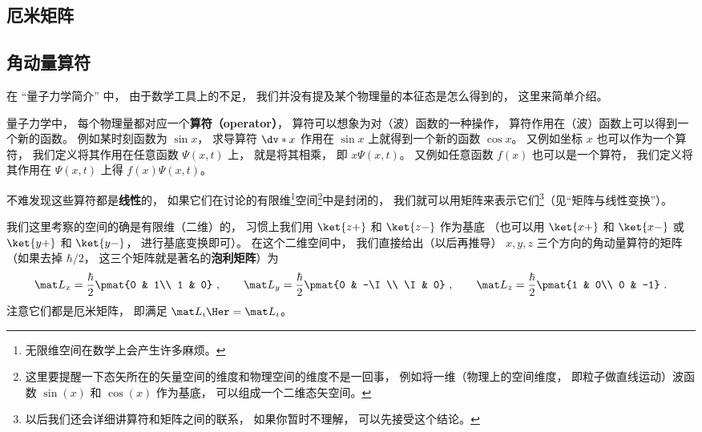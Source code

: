 \subsection{厄米矩阵}






\subsection{角动量算符}
在 “量子力学简介” 中， 由于数学工具上的不足， 我们并没有提及某个物理量的本征态是怎么得到的， 这里来简单介绍。

量子力学中， 每个物理量都对应一个\textbf{算符（operator）}， 算符可以想象为对（波）函数的一种操作， 算符作用在（波）函数上可以得到一个新的函数。 例如某时刻函数为 $\sin x$， 求导算符 $\dv*{x}$ 作用在 $\sin x$ 上就得到一个新的函数 $\cos x$。 又例如坐标 $x$ 也可以作为一个算符， 我们定义将其作用在任意函数 $\Psi(x, t)$ 上， 就是将其相乘， 即 $x\Psi(x, t)$。 又例如任意函数 $f(x)$ 也可以是一个算符， 我们定义将其作用在 $\Psi(x, t)$ 上得 $f(x)\Psi(x, t)$。

不难发现这些算符都是\textbf{线性}的， 如果它们在讨论的有限维\footnote{无限维空间在数学上会产生许多麻烦。}空间\footnote{这里要提醒一下态矢所在的矢量空间的维度和物理空间的维度不是一回事， 例如将一维（物理上的空间维度， 即粒子做直线运动）波函数 $\sin(x)$ 和 $\cos(x)$ 作为基底， 可以组成一个二维态矢空间。}中是封闭的， 我们就可以用矩阵来表示它们\footnote{以后我们还会详细讲算符和矩阵之间的联系， 如果你暂时不理解， 可以先接受这个结论。}（见“矩阵与线性变换”）。%

我们这里考察的空间的确是有限维（二维）的， 习惯上我们用 $\ket{z+}$ 和 $\ket{z-}$ 作为基底 （也可以用 $\ket{x+}$ 和 $\ket{x-}$ 或 $\ket{y+}$ 和 $\ket{y-}$， 进行基底变换即可）。 在这个二维空间中， 我们直接给出（以后再推导） $x, y, z$ 三个方向的角动量算符的矩阵（如果去掉 $\hbar/2$， 这三个矩阵就是著名的\textbf{泡利矩阵}）为
\begin{equation}
\mat L_x = \frac{\hbar}{2}\pmat{0 & 1\\ 1 & 0}~,
\qquad
\mat L_y = \frac{\hbar}{2}\pmat{0 & -\I \\ \I & 0}~,
\qquad
\mat L_z = \frac{\hbar}{2}\pmat{1 & 0\\ 0 & -1}~.
\end{equation}
注意它们都是厄米矩阵， 即满足 $\mat L_i\Her = \mat L_i$。%

